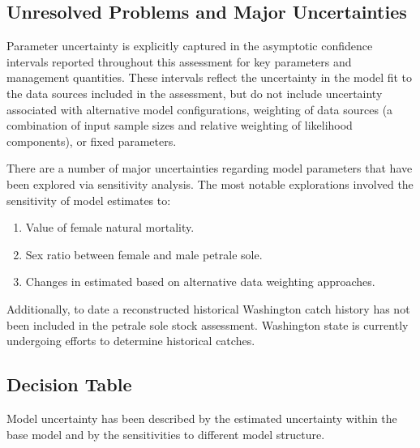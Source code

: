\documentclass[12pt,]{article}
\begin{document}
\FloatBarrier

\subsection*{Unresolved Problems and Major
Uncertainties}\label{unresolved-problems-and-major-uncertainties}

Parameter uncertainty is explicitly captured in the asymptotic
confidence intervals reported throughout this assessment for key
parameters and management quantities. These intervals reflect the
uncertainty in the model fit to the data sources included in the
assessment, but do not include uncertainty associated with alternative
model configurations, weighting of data sources (a combination of input
sample sizes and relative weighting of likelihood components), or fixed
parameters.

There are a number of major uncertainties regarding model parameters
that have been explored via sensitivity analysis. The most notable
explorations involved the sensitivity of model estimates to:

\begin{enumerate}

\item Value of female natural mortality.

\item Sex ratio between female and male petrale sole.

\item Changes in estimated based on alternative data weighting approaches.

\end{enumerate}

Additionally, to date a reconstructed historical Washington catch
history has not been included in the petrale sole stock assessment.
Washington state is currently undergoing efforts to determine historical
catches.

\subsection*{Decision Table}\label{decision-table}

Model uncertainty has been described by the estimated uncertainty within
the base model and by the sensitivities to different model structure.
\end{document}
